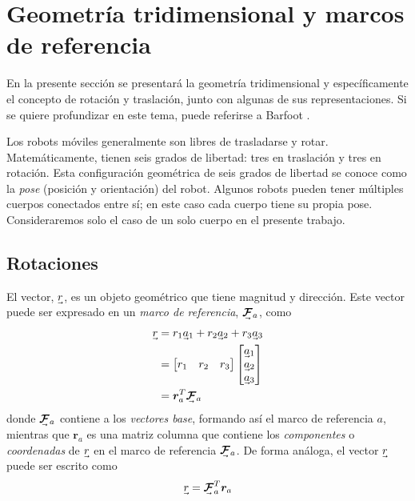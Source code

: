 \section{Geometría tridimensional y marcos de referencia}
En la presente sección se presentará la geometría tridimensional y específicamente el concepto de rotación y traslación, junto con algunas de sus representaciones. Si se quiere profundizar en este tema, puede referirse a Barfoot \cite{barfoot2020}.%

Los robots móviles generalmente son libres de trasladarse y rotar. Matemáticamente, tienen seis grados de libertad: tres en traslación y tres en rotación. Esta configuración geométrica de seis grados de libertad se conoce como la \textit{pose} (posición y orientación) del robot. Algunos robots pueden tener múltiples cuerpos conectados entre sí; en este caso cada cuerpo tiene su propia pose. Consideraremos solo el caso de un solo cuerpo en el presente trabajo.

\subsection{Rotaciones}
El vector, $\undervec{r}$, es un objeto geométrico que tiene magnitud y dirección. Este vector puede ser expresado en un \textit{marco de referencia}, $\undervec{\bm{\mathcal{F}}}_a$, como
\begin{align}
    \undervec{r} &= r_1\undervec{a}_1+ r_2\undervec{a}_2 + r_3\undervec{a}_3 \\
    &= 
    \begin{bmatrix}
    r_1 & r_2 & r_3
    \end{bmatrix}
    \begin{bmatrix}
    \undervec{a}_1 \\ 
    \undervec{a}_2 \\
    \undervec{a}_3
    \end{bmatrix}
    \\
    &= \bm{r}_a^T\undervec{\bm{\mathcal{F}}}_a
\end{align}
donde $\undervec{\bm{\mathcal{F}}}_a$ contiene a los \textit{vectores base}, formando así el marco de referencia $a$, mientras que $\bm{r}_a$ es una matriz columna que contiene los \textit{componentes} o \textit{coordenadas} de $\undervec{r}$ en el marco de referencia $\undervec{\bm{\mathcal{F}}}_a$. De forma análoga, el vector $\undervec{r}$ puede ser escrito como
\begin{equation}
    \undervec{r} = \undervec{\bm{\mathcal{F}}}_a^T \bm{r}_a
\end{equation}


